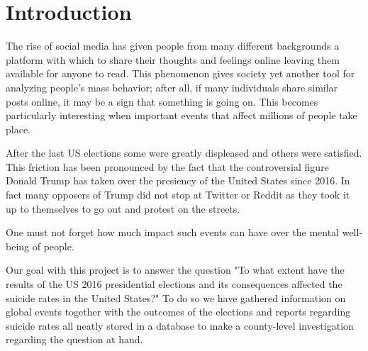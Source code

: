 \section{Introduction}
\label{g1:sec:introduction}

The rise of social media has given people from many different
backgrounds a platform with which to share their thoughts
and feelings online leaving them available for anyone to read.
This phenomenon gives society yet another tool for analyzing
people's mass behavior; after all, if many individuals share
similar posts online, it may be a sign that something
is going on.
This becomes particularly interesting
when important events that affect millions of people take
place.

After the last US elections
some were greatly displeased and others were
satisfied. This friction has been pronounced by the fact
that the controversial figure Donald Trump has taken over
the presiency of the United States since 2016. In fact many opposers of Trump did not stop at Twitter or Reddit as they
took it up to themselves to go out and protest on the streets.

One must not forget how much impact such events can have over
the mental well-being of people.

Our goal with this project is to answer the question
"To what extent have the results of the US 2016 presidential
elections and its consequences
affected the suicide rates in the United States?"
To do so we have gathered information on global events together with the outcomes of the elections
and reports regarding suicide rates all neatly stored in a database
to make a county-level investigation
regarding the question at hand.
